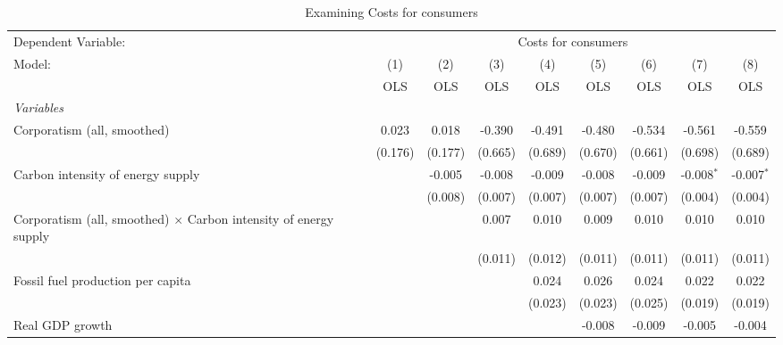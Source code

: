 
\begin{table}[htbp]
   \caption{Examining Costs for consumers}
   \centering
   \begin{tabular}{lcccccccc}
      \toprule
      Dependent Variable: & \multicolumn{8}{c}{Costs for consumers}\\
      Model:                                                                  & (1)     & (2)     & (3)     & (4)     & (5)     & (6)     & (7)          & (8)\\  
                                                                              &  OLS    & OLS     & OLS     & OLS     & OLS     & OLS     & OLS          & OLS\\  
      \midrule
      \emph{Variables}\\
      Corporatism (all, smoothed)                                             & 0.023   & 0.018   & -0.390  & -0.491  & -0.480  & -0.534  & -0.561       & -0.559\\   
                                                                              & (0.176) & (0.177) & (0.665) & (0.689) & (0.670) & (0.661) & (0.698)      & (0.689)\\   
      Carbon intensity of energy supply                                       &         & -0.005  & -0.008  & -0.009  & -0.008  & -0.009  & -0.008$^{*}$ & -0.007$^{*}$\\   
                                                                              &         & (0.008) & (0.007) & (0.007) & (0.007) & (0.007) & (0.004)      & (0.004)\\   
      Corporatism (all, smoothed) $\times$ Carbon intensity of energy supply  &         &         & 0.007   & 0.010   & 0.009   & 0.010   & 0.010        & 0.010\\   
                                                                              &         &         & (0.011) & (0.012) & (0.011) & (0.011) & (0.011)      & (0.011)\\   
      Fossil fuel production per capita                                       &         &         &         & 0.024   & 0.026   & 0.024   & 0.022        & 0.022\\   
                                                                              &         &         &         & (0.023) & (0.023) & (0.025) & (0.019)      & (0.019)\\   
      Real GDP growth                                                         &         &         &         &         & -0.008  & -0.009  & -0.005       & -0.004\\   

\end{tabular}
\end{table}

